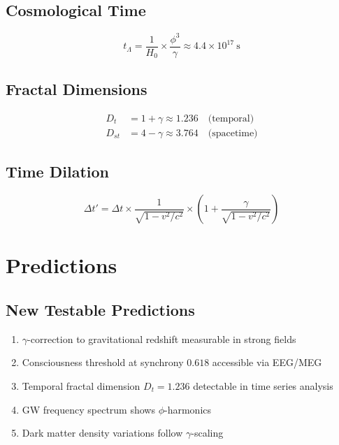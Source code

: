 \documentclass[12pt,a4paper]{article}
\begin{document}
\subsection{Cosmological Time}

\begin{equation}
t_\Lambda = \frac{1}{H_0} \times \frac{\phi^3}{\gamma} \approx 4.4 \times 10^{17}~\text{s}
\end{equation}

\subsection{Fractal Dimensions}

\begin{align}
D_t &= 1 + \gamma \approx 1.236 \quad \text{(temporal)} \\
D_{st} &= 4 - \gamma \approx 3.764 \quad \text{(spacetime)}
\end{align}

\subsection{Time Dilation}

\begin{equation}
\Delta t' = \Delta t \times \frac{1}{\sqrt{1 - v^2/c^2}} \times \left(1 + \frac{\gamma}{\sqrt{1 - v^2/c^2}}\right)
\end{equation}

\section{Predictions}

\subsection{New Testable Predictions}

\begin{enumerate}
\item $\gamma$-correction to gravitational redshift measurable in strong fields
\item Consciousness threshold at synchrony $0.618$ accessible via EEG/MEG
\item Temporal fractal dimension $D_t = 1.236$ detectable in time series analysis
\item GW frequency spectrum shows $\phi$-harmonics
\item Dark matter density variations follow $\gamma$-scaling
\end{enumerate}
\end{document}
